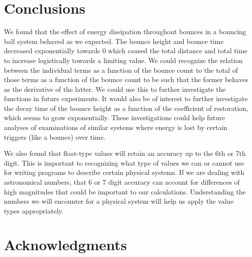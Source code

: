 \documentclass[aps,prl,twocolumn,superscriptaddress]{revtex4-1}
\begin{document}
\section{Conclusions}
We found that the effect of energy dissipation throughout bounces in a bouncing ball system behaved as we expected. The bounce height and bounce time decreased exponentially towards 0 which caused the total distance and total time to increase logistically towards a limiting value. We could recognize the relation between the individual terms as a function of the bounce count to the total of those terms as a function of the bounce count to be such that the former behaves as the derivative of the latter. We could use this to further investigate the functions in future experiments. It would also be of interest to further investigate the decay time of the bounce height as a function of the coefficient of restoration, which seems to grow exponentially. These investigations could help future analyses of examinations of similar systems where energy is lost by certain triggers (like a bounce) over time.

We also found that float-type values will retain an accuracy up to the 6th or 7th digit. This is important to recognizing what type of values we can or cannot use for writing programs to describe certain physical systems. If we are dealing with astronomical numbers, that 6 or 7 digit accuracy can account for differences of high magnitudes that could be important to our calculations. Understanding the numbers we will encounter for a physical system will help us apply the value types appropriately.

\section*{Acknowledgments}
\setlength{\parindent}{0cm}



\end{document}
